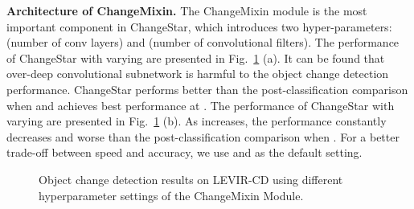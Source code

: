 \documentclass[10pt,twocolumn,letterpaper]{article}
\begin{document}
\noindent\textbf{Architecture of ChangeMixin.}
The ChangeMixin module is the most important component in ChangeStar, which introduces two hyper-parameters:  (number of conv layers) and  (number of convolutional filters).
The performance of ChangeStar with varying  are presented in Fig.~\ref{fig:abs_arch} (a).
It can be found that over-deep convolutional subnetwork is harmful to the object change detection performance.
ChangeStar performs better than the post-classification comparison when  and achieves best performance at .
The performance of ChangeStar with varying  are presented in Fig.~\ref{fig:abs_arch} (b).
As  increases, the performance constantly decreases and worse than the post-classification comparison when .
For a better trade-off between speed and accuracy, we use  and  as the default setting.

\vspace{-4mm}
\begin{figure}[htb]
    \centering
    \vspace{-4mm}
    \vspace{-4mm}
    \caption{Object change detection results on LEVIR-CD using different hyperparameter settings of the ChangeMixin Module.
    }
    \label{fig:abs_arch}
    \vspace{-4mm}
\end{figure}
\end{document}
